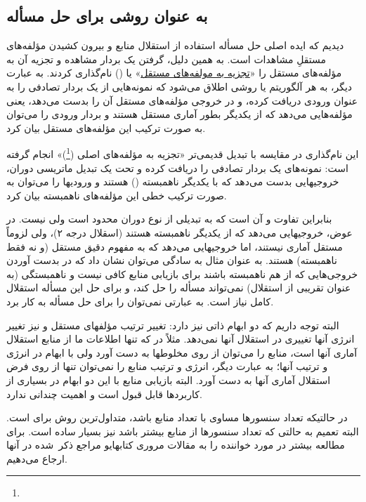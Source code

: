 \subsection{ به عنوان روشی برای حل مسأله }
دیدیم که ایده اصلی حل مسأله 
استفاده از  استقلال منابع و بیرون کشیدن مؤلفه‌های مستقلِ
مشاهدات است. به همین دلیل، گرفتن یک بردار مشاهده و تجزیه آن به مؤلفه‌های مستقل را
«\underline{تجزیه به مولفه‌های مستقل}» 
یا () نام‌گذاری کردند. به عبارت دیگر،
 به هر آلگوریتم یا روشی اطلاق می‌شود که نمونه‌هایی از یک بردار تصادفی را به عنوان ورودی  
دریافت کرده، و در خروجی مؤلفه‌های مستقل آن را بدست می‌دهد، یعنی مؤلفه‌هایی می‌دهد که از یکدیگر
بطور آماری  مستقل هستند و بردار ورودی را می‌توان به صورت ترکیب این مؤلفه‌های مستقل بیان کرد.

این نام‌گذاری در مقایسه با تبدیل قدیمی‌تر «تجزیه به مؤلفه‌های اصلی 
(\footnote{})» انجام گرفته است:  نمونه‌های یک بردار تصادفی را
دریافت کرده و تحت یک تبدیل ماتریسی دوران، خروجیهایی بدست می‌دهد که با یکدیگر ناهمبسته ()
هستند و ورودیها را می‌توان به صورت ترکیب خطی این مؤلفه‌های ناهمبسته بیان کرد.

بنابراین تفاوت  و  آن است که  به تبدیلی از نوع دوران محدود است ولی  نیست. در عوض،
 خروجیهایی می‌دهد که از یکدیگر ناهمبسته هستند (اسقلال درجه ۲)، ولی لزوماً مستقل آماری نیستند، اما
 خروجیهایی می‌دهد که به مفهوم دقیق مستقل (و نه فقط ناهمبسته) هستند. 
به عنوان مثال به سادگی می‌توان نشان داد که 
در  بدست آوردن خروجی‌هایی که از هم ناهمبسته باشند برای بازیابی منابع کافی نیست و ناهمبستگی (به عنوان
تقریبی از استقلال) نمی‌تواند مسأله  را حل کند، و برای حل این مسأله استقلال کامل نیاز است. به عبارتی
نمی‌توان  را برای حل مسأله  به کار برد.

البته توجه داریم که  دو ابهام ذاتی نیز دارد: تغییر ترتیب مؤلفهای مستقل و نیز تغییر انرژی آنها
تغییری در استقلال آنها نمی‌دهد. مثلاً در  که تنها اطلاعات ما از منابع استقلال آماری آنها است، 
منابع را می‌توان از روی مخلوطها به دست آورد ولی با ابهام در انرژی و ترتیب آنها؛ به عبارت دیگر،
انرژی و ترتیب منابع را نمی‌توان تنها از روی فرض استقلال آماری آنها به دست آورد. البته 
بازیابی منابع با این دو ابهام
در بسیاری از کاربردها قابل قبول است  و اهمیت چندانی ندارد.

در حالتیکه تعداد سنسورها مساوی با تعداد منابع باشد،  متداول‌ترین روش برای  است. البته تعمیم 
 به حالتی که تعداد سنسورها از منابع بیشتر باشد نیز بسیار ساده است.
برای مطالعه بیشتر در مورد  خواننده را به 
مقالات مروری
کتابهایو مراجع ذکر~شده در آنها ارجاع می‌دهیم.


